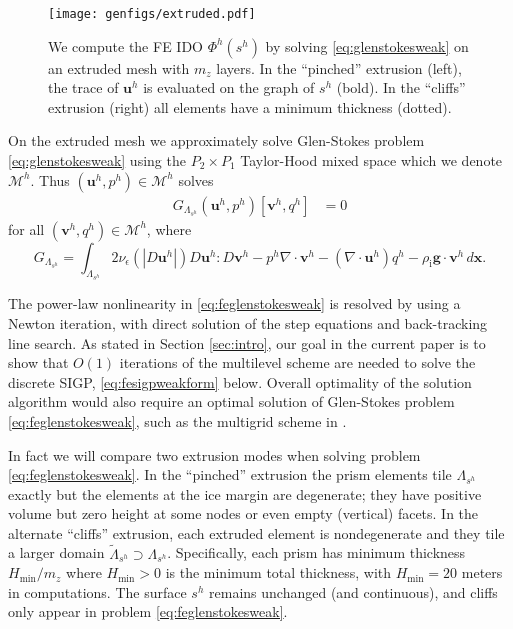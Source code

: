 \documentclass[letterpaper,final,12pt,reqno]{amsart}
\theoremstyle{claim}
\newcommand{\eps}{\epsilon}
\newcommand{\Div}{\nabla\cdot}
\newcommand{\bg}{\mathbf{g}}
\newcommand{\bu}{\mathbf{u}}
\newcommand{\bv}{\mathbf{v}}
\newcommand{\bx}{\mathbf{x}}
\newcommand{\rhoi}{\rho_{\text{i}}}
\numberwithin{equation}{section}
\numberwithin{figure}{section}
\numberwithin{table}{section}
\numberwithin{theorem}{section}
\begin{document}
\begin{figure}[t]
\begin{center}
\texttt{[image: genfigs/extruded.pdf]}
\end{center}
\caption{We compute the FE IDO $\Phi^h(s^h)$ by solving \eqref{eq:glenstokesweak} on an extruded mesh with $m_z$ layers.  In the ``pinched'' extrusion (left), the trace of $\bu^h$ is evaluated on the graph of $s^h$ (bold).  In the ``cliffs'' extrusion (right) all elements have a minimum thickness (dotted).}
\label{fig:extruded}
\end{figure}

On the extruded mesh we approximately solve Glen-Stokes problem \eqref{eq:glenstokesweak} using the $P_2\times P_1$ Taylor-Hood mixed space \cite{Elmanetal2014} which we denote $\mathcal{M}^h$.  Thus $(\bu^h,p^h) \in \mathcal{M}^h$ solves
\begin{align}
G_{\Lambda_{s^h}}(\bu^h,p^h)[\bv^h,q^h] &= 0  \label{eq:feglenstokesweak}
\end{align}
for all $(\bv^h,q^h) \in \mathcal{M}^h$, where
\begin{equation}
G_{\Lambda_{s^h}} = \int_{\Lambda_{s^h}} 2 \nu_\eps(|D\bu^h|) D\bu^h : D\bv^h - p^h \Div\bv^h - (\Div\bu^h) q^h - \rhoi \bg \cdot \bv^h\,d\bx.  \label{eq:feglenstokesfunctional}
\end{equation}

The power-law nonlinearity in \eqref{eq:feglenstokesweak} is resolved by using a Newton iteration, with direct solution of the step equations and back-tracking line search.  As stated in Section \ref{sec:intro}, our goal in the current paper is to show that $O(1)$ iterations of the multilevel scheme are needed to solve the discrete SIGP, \eqref{eq:fesigpweakform} below.  Overall optimality of the solution algorithm would also require an optimal solution of Glen-Stokes problem \eqref{eq:feglenstokesweak}, such as the multigrid scheme in \cite{IsaacStadlerGhattas2015}.

In fact we will compare two extrusion modes when solving problem \eqref{eq:feglenstokesweak}.  In the ``pinched'' extrusion the prism elements tile $\Lambda_{s^h}$ exactly but the elements at the ice margin are degenerate; they have positive volume but zero height at some nodes or even empty (vertical) facets.  In the alternate ``cliffs'' extrusion, each extruded element is nondegenerate and they tile a larger domain $\tilde\Lambda_{s^h} \supset \Lambda_{s^h}$.  Specifically, each prism has minimum thickness $H_{\text{min}}/m_z$ where $H_{\text{min}} > 0$ is the minimum total thickness, with $H_{\text{min}} = 20$ meters in computations.  The surface $s^h$ remains unchanged (and continuous), and cliffs only appear in problem \eqref{eq:feglenstokesweak}.
\end{document}
